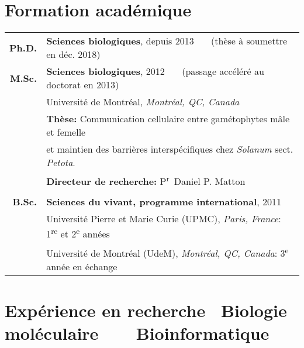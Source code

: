 \documentclass[letterpaper,10pt]{article}
\begin{document}
\section{Formation académique}
\begin{tabular}{r|p{15cm}}

  \textbf{Ph.D.}
  & \textbf{Sciences biologiques}, depuis 2013
    ~~~\small{(thèse à soumettre en déc. 2018)} \\

  \textbf{M.Sc.}
  & \textbf{Sciences biologiques}, 2012
    ~~~\small{(passage accéléré au doctorat en 2013)} \vspace{0.5mm} \\
  & \hspace{1.5mm} Université de Montréal, \emph{Montréal, QC, Canada} \\
  & \hspace{1.5mm} {\small \textbf{Thèse:} Communication cellulaire entre gamétophytes mâle et femelle} \\
  & \hspace{1.5mm} {\small \phantom{\textbf{Thèse:}} et maintien des barrières interspécifiques chez \emph{Solanum} sect. \emph{Petota}.} \\
  & \hspace{1.5mm} {\small \textbf{Directeur de recherche:} P\textsuperscript{r}~Daniel P. Matton}
    \hspace{1mm} \\

  \multicolumn{2}{c}{} \\

  \textbf{B.Sc.}
  & \textbf{Sciences du vivant, programme international}, 2011 \vspace{0.5mm} \\
  & \hspace{1.5mm} Université Pierre et Marie Curie (UPMC),
    \emph{Paris, France}: 1\textsuperscript{re} et 2\textsuperscript{e} années \\
  & \hspace{1.5mm} Université de Montréal (UdeM),
    \emph{Montréal, QC, Canada}: 3\textsuperscript{e} année en échange \\

\end{tabular}

\bigskip


\section[Expérience en recherche]{Expérience en recherche
         \hfill \small{{\mdseries\faFlask}~Biologie moléculaire~~~{\mdseries\faCode}~Bioinformatique}}
\end{document}
